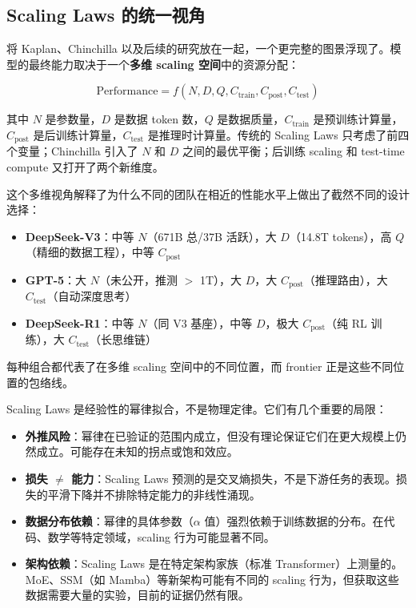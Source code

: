\subsection{Scaling Laws 的统一视角}

将 Kaplan、Chinchilla 以及后续的研究放在一起，一个更完整的图景浮现了。模型的最终能力取决于一个\textbf{多维 scaling 空间}中的资源分配：

\begin{equation}
  \text{Performance} = f(N, D, Q, C_{\text{train}}, C_{\text{post}}, C_{\text{test}})
\end{equation}

其中 $N$ 是参数量，$D$ 是数据 token 数，$Q$ 是数据质量，$C_{\text{train}}$ 是预训练计算量，$C_{\text{post}}$ 是后训练计算量，$C_{\text{test}}$ 是推理时计算量。传统的 Scaling Laws 只考虑了前四个变量；Chinchilla 引入了 $N$ 和 $D$ 之间的最优平衡；后训练 scaling 和 test-time compute 又打开了两个新维度。

这个多维视角解释了为什么不同的团队在相近的性能水平上做出了截然不同的设计选择：
\begin{itemize}[noitemsep]
  \item \textbf{DeepSeek-V3}：中等 $N$（671B 总/37B 活跃），大 $D$（14.8T tokens），高 $Q$（精细的数据工程），中等 $C_{\text{post}}$
  \item \textbf{GPT-5}：大 $N$（未公开，推测 $>$ 1T），大 $D$，大 $C_{\text{post}}$（推理路由），大 $C_{\text{test}}$（自动深度思考）
  \item \textbf{DeepSeek-R1}：中等 $N$（同 V3 基座），中等 $D$，极大 $C_{\text{post}}$（纯 RL 训练），大 $C_{\text{test}}$（长思维链）
\end{itemize}

每种组合都代表了在多维 scaling 空间中的不同位置，而 frontier 正是这些不同位置的包络线。

\begin{warnbox}
Scaling Laws 是经验性的幂律拟合，不是物理定律。它们有几个重要的局限：
\begin{itemize}[noitemsep]
  \item \textbf{外推风险}：幂律在已验证的范围内成立，但没有理论保证它们在更大规模上仍然成立。可能存在未知的拐点或饱和效应。
  \item \textbf{损失 $\neq$ 能力}：Scaling Laws 预测的是交叉熵损失，不是下游任务的表现。损失的平滑下降并不排除特定能力的非线性涌现。
  \item \textbf{数据分布依赖}：幂律的具体参数（$\alpha$ 值）强烈依赖于训练数据的分布。在代码、数学等特定领域，scaling 行为可能显著不同。
  \item \textbf{架构依赖}：Scaling Laws 是在特定架构家族（标准 Transformer）上测量的。MoE、SSM（如 Mamba）等新架构可能有不同的 scaling 行为，但获取这些数据需要大量的实验，目前的证据仍然有限。
\end{itemize}
\end{warnbox}

